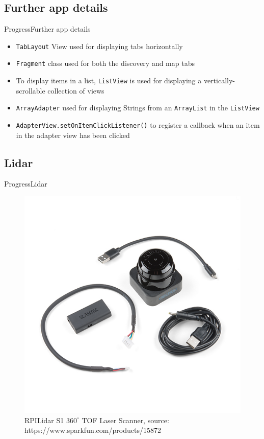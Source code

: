 \documentclass{beamer}
\begin{document}
\subsection{Further app details}
\begin{frame}{Progress}{Further app details}
    \begin{itemize}
        \item \texttt{TabLayout} View used for displaying tabs horizontally
        \item \texttt{Fragment} class used for both the discovery and map tabs
        \item To display items in a list, \texttt{ListView} is used for displaying a vertically-scrollable collection of views
        \item \texttt{ArrayAdapter} used for displaying Strings from an \texttt{ArrayList} in the \texttt{ListView}
        \item \texttt{AdapterView.setOnItemClickListener()} to register a callback when an item in the adapter view has been clicked
    \end{itemize}
\end{frame}

\subsection{Lidar}
\begin{frame}{Progress}{Lidar}
    \begin{figure}
        \centering
        \includegraphics[scale=1]{figs/img/15872-Slamtec_RPLIDAR_S1-01.jpg}
        \caption{RPILidar S1 $360^\circ$ TOF Laser Scanner, source: https://www.sparkfun.com/products/15872}
        \label{fig:my_label}
    \end{figure}
\end{frame}
\end{document}
